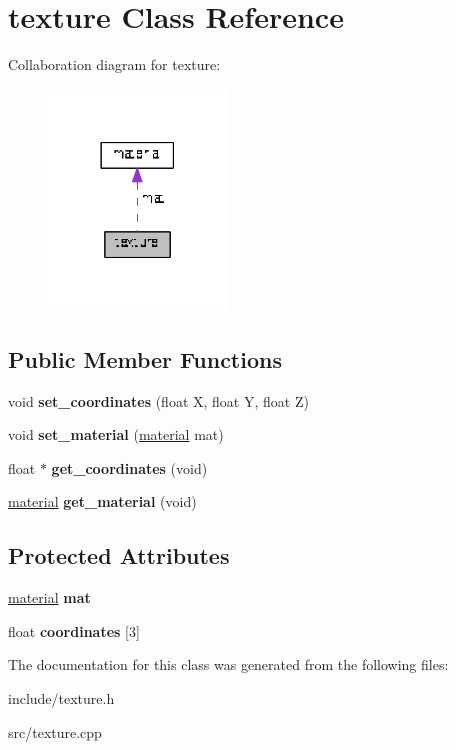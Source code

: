 \hypertarget{classtexture}{}\section{texture Class Reference}
\label{classtexture}


Collaboration diagram for texture\+:\nopagebreak
\begin{figure}[H]
\begin{center}
\leavevmode
\includegraphics[width=134pt]{classtexture__coll__graph}
\end{center}
\end{figure}
\subsection*{Public Member Functions}
\begin{DoxyCompactItemize}
\item 
\mbox{\label{classtexture_a0aeca71981bee04120f7fc6dbf01538a}} 
void {\bfseries set\+\_\+coordinates} (float X, float Y, float Z)
\item 
\mbox{\label{classtexture_a690ccaae30a2889a11fe173fed5fa94c}} 
void {\bfseries set\+\_\+material} (\hyperlink{classmaterial}{material} mat)
\item 
\mbox{\label{classtexture_ad6a301fc2cf119b754e4271f13e2519b}} 
float $\ast$ {\bfseries get\+\_\+coordinates} (void)
\item 
\mbox{\label{classtexture_ab6e571045296821665a39fcef954bdaf}} 
\hyperlink{classmaterial}{material} {\bfseries get\+\_\+material} (void)
\end{DoxyCompactItemize}
\subsection*{Protected Attributes}
\begin{DoxyCompactItemize}
\item 
\mbox{\label{classtexture_af1a2827693630a27cbac75c70895e218}} 
\hyperlink{classmaterial}{material} {\bfseries mat}
\item 
\mbox{\label{classtexture_aa14cf2014b7154e2de6c13ff64865d86}} 
float {\bfseries coordinates} \mbox{[}3\mbox{]}
\end{DoxyCompactItemize}


The documentation for this class was generated from the following files\+:\begin{DoxyCompactItemize}
\item 
include/texture.\+h\item 
src/texture.\+cpp\end{DoxyCompactItemize}
